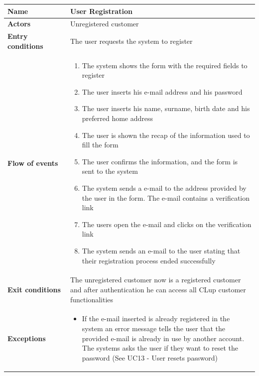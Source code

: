 \begin{longtable}{p{0.25\linewidth}p{0.75\linewidth}}
    \toprule
    \textbf{Name}             & \textbf{User Registration}                                                                                                      \\
    \midrule
    \textbf{Actors}           & Unregistered customer                                                                                                           \\
    \midrule
    \textbf{Entry conditions} & The user requests the system to register                                                                                        \\
    \midrule
    \textbf{Flow of events}   &
    \begin{enumerate}
        \item The system shows the form with the required fields to register
        \item The user inserts his e-mail address and his password
        \item The user inserts his name, surname, birth date and his preferred home address
        \item The user is shown the recap of the information used to fill the form
        \item The user confirms the information, and the form is sent to the system
        \item The system sends a e-mail to the address provided by the user in the form. The e-mail contains a verification link
        \item The users open the e-mail and clicks on the verification link
        \item The system sends an e-mail to the user stating that their registration process ended successfully
    \end{enumerate}                                                                                                                                   \\
    \midrule
    \textbf{Exit conditions}  & The unregistered customer now is a registered customer and after authentication he can access all CLup customer functionalities \\
    \midrule
    \textbf{Exceptions}       &
    \begin{itemize}
        \item If the e-mail inserted is already registered in the system an error message tells the user that the provided e-mail is already in use by another account. The systems asks the user if they want to reset the password (See UC13 - User resets password) %

\end{itemize}
\end{longtable}
